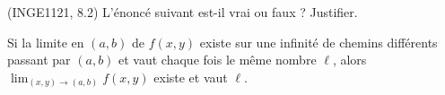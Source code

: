

\begin{exercice}\label{exoFoncDeuxVar0011}

	(INGE1121, 8.2) L'énoncé suivant est-il vrai ou faux ? Justifier.

	Si la limite en $(a,b)$ de $f(x,y)$ existe sur une infinité de chemins différents passant par $(a,b)$ et vaut chaque fois le même nombre $\ell$, alors $\lim_{(x,y)\to(a,b)}f(x,y)$ existe et vaut $\ell$.

\end{exercice}
